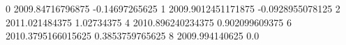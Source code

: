 0 2009.84716796875 -0.14697265625
1 2009.9012451171875 -0.0928955078125
2 2011.021484375 1.02734375
4 2010.896240234375 0.902099609375
6 2010.3795166015625 0.3853759765625
8 2009.994140625 0.0
